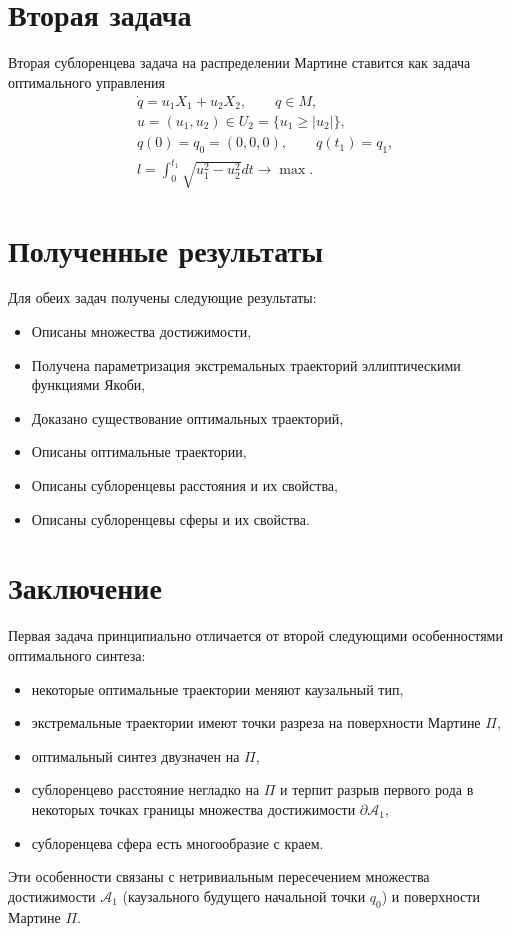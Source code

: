 \section{Вторая задача}

Вторая сублоренцева задача на распределении Мартине ставится как задача оптимального управления 
\begin{align}
&\dot q = u_1 X_1 + u_2 X_2, \qquad q \in M, \label{pr21} \\
&u= (u_1, u_2) \in U_2 = \{u_1 \geq |u_2|\}, \label{pr22}\\
&q(0) = q_0 = (0, 0, 0), \qquad q(t_1) = q_1, \label{pr23}\\
&l = \int_0^{t_1} \sqrt{u_1^2-u_2^2}dt \to \max. \label{pr24}
\end{align}

\section{Полученные результаты}

Для обеих задач получены следующие результаты:
\begin{itemize}
\item
Описаны множества достижимости,   
\item
Получена параметризация экстремальных траекторий эллиптическими функциями Якоби,
\item
Доказано существование оптимальных траекторий,
\item
Описаны оптимальные траектории,
\item
Описаны сублоренцевы
расстояния и их свойства,
\item
Описаны сублоренцевы сферы и их свойства.
\end{itemize}


\section{Заключение}
Первая задача принципиально отличается от второй следующими особенностями 
оптимального синтеза:
\begin{itemize}
\item
некоторые оптимальные траектории меняют каузальный тип,
\item
экстремальные траектории имеют точки разреза на поверхности Мартине $\Pi$,
\item
оптимальный синтез двузначен на $\Pi$,
\item
сублоренцево расстояние негладко на $\Pi$ и терпит разрыв первого рода в некоторых точках границы множества достижимости $\partial \mathcal{A}_1$,
\item
сублоренцева сфера есть многообразие с краем.
\end{itemize}
Эти особенности связаны с нетривиальным  
пересечением множества достижимости $\mathcal{A}_1$ (каузального будущего начальной точки $q_0$) и 
поверхности Мартине 
$\Pi$.   


